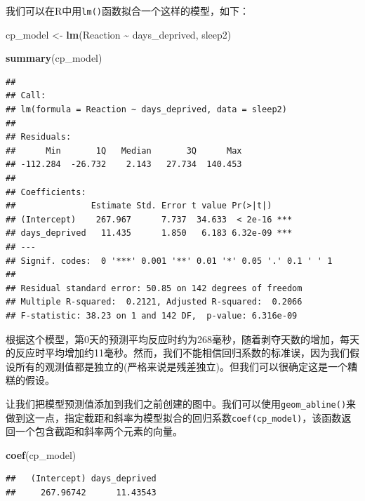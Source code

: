 \documentclass[
]{book}
\newenvironment{Shaded}{\begin{snugshade}}{\end{snugshade}}
\newcommand{\FunctionTok}[1]{\textcolor[rgb]{0.13,0.29,0.53}{\textbf{#1}}}
\newcommand{\NormalTok}[1]{#1}
\newcommand{\OtherTok}[1]{\textcolor[rgb]{0.56,0.35,0.01}{#1}}
\newcommand{\SpecialCharTok}[1]{\textcolor[rgb]{0.81,0.36,0.00}{\textbf{#1}}}
\begin{document}
我们可以在R中用\texttt{lm()}函数拟合一个这样的模型，如下：

\begin{Shaded}
\begin{Highlighting}[]
\NormalTok{cp\_model }\OtherTok{\textless{}{-}} \FunctionTok{lm}\NormalTok{(Reaction }\SpecialCharTok{\textasciitilde{}}\NormalTok{ days\_deprived, sleep2)}

\FunctionTok{summary}\NormalTok{(cp\_model)}
\end{Highlighting}
\end{Shaded}

\begin{verbatim}
## 
## Call:
## lm(formula = Reaction ~ days_deprived, data = sleep2)
## 
## Residuals:
##      Min       1Q   Median       3Q      Max 
## -112.284  -26.732    2.143   27.734  140.453 
## 
## Coefficients:
##               Estimate Std. Error t value Pr(>|t|)    
## (Intercept)    267.967      7.737  34.633  < 2e-16 ***
## days_deprived   11.435      1.850   6.183 6.32e-09 ***
## ---
## Signif. codes:  0 '***' 0.001 '**' 0.01 '*' 0.05 '.' 0.1 ' ' 1
## 
## Residual standard error: 50.85 on 142 degrees of freedom
## Multiple R-squared:  0.2121, Adjusted R-squared:  0.2066 
## F-statistic: 38.23 on 1 and 142 DF,  p-value: 6.316e-09
\end{verbatim}

根据这个模型，第0天的预测平均反应时约为268毫秒，随着剥夺天数的增加，每天的反应时平均增加约11毫秒。然而，我们不能相信回归系数的标准误，因为我们假设所有的观测值都是独立的(严格来说是残差独立)。但我们可以很确定这是一个糟糕的假设。

让我们把模型预测值添加到我们之前创建的图中。我们可以使用\texttt{geom\_abline()}来做到这一点，指定截距和斜率为模型拟合的回归系数\texttt{coef(cp\_model)}，该函数返回一个包含截距和斜率两个元素的向量。

\begin{Shaded}
\begin{Highlighting}[]
\FunctionTok{coef}\NormalTok{(cp\_model)}
\end{Highlighting}
\end{Shaded}

\begin{verbatim}
##   (Intercept) days_deprived 
##     267.96742      11.43543
\end{verbatim}
\end{document}
